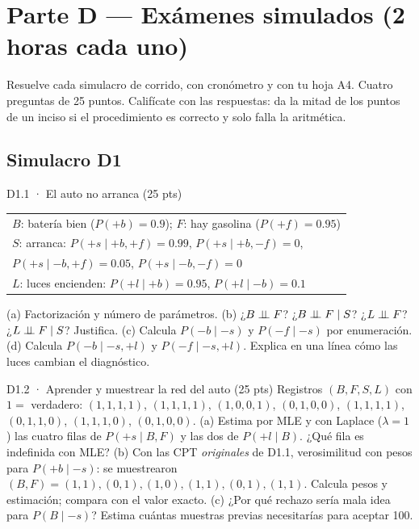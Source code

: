 \newpage
\section{Parte D — Exámenes simulados (2 horas cada uno)}

\begin{nota}
Resuelve cada simulacro de corrido, con cronómetro y con tu hoja A4. Cuatro preguntas de 25 puntos. Califícate con las
respuestas: da la mitad de los puntos de un inciso si el procedimiento es correcto y solo falla la aritmética.
\end{nota}

\subsection*{Simulacro D1}

\begin{ejercicio}{D1.1 · El auto no arranca (25 pts) }
\begin{center}\figCar\qquad
{\small\begin{tabular}{l}
$B$: batería bien ($P(+b)=0.9$); $F$: hay gasolina ($P(+f)=0.95$)\\
$S$: arranca: $P(+s\mid+b,+f)=0.99$, $P(+s\mid+b,-f)=0$,\\
\hspace{3.5em}$P(+s\mid-b,+f)=0.05$, $P(+s\mid-b,-f)=0$\\
$L$: luces encienden: $P(+l\mid+b)=0.95$, $P(+l\mid-b)=0.1$
\end{tabular}}\end{center}
(a)  Factorización y número de parámetros. (b)  ¿$B\perp\!\!\!\perp F$? ¿$B\perp\!\!\!\perp F\mid S$? ¿$L\perp\!\!\!\perp F$? ¿$L\perp\!\!\!\perp F\mid S$? Justifica.
(c)  Calcula $P(-b\mid-s)$ y $P(-f\mid-s)$ por enumeración.
(d)  Calcula $P(-b\mid-s,+l)$ y $P(-f\mid-s,+l)$. Explica en una línea cómo las luces cambian el diagnóstico.
\end{ejercicio}

\begin{ejercicio}{D1.2 · Aprender y muestrear la red del auto (25 pts) }
Registros $(B,F,S,L)$ con $1=$ verdadero: $(1,1,1,1)$, $(1,1,1,1)$, $(1,0,0,1)$, $(0,1,0,0)$, $(1,1,1,1)$, $(0,1,1,0)$, $(1,1,1,0)$, $(0,1,0,0)$.
(a)  Estima por MLE y con Laplace ($\lambda=1$) las cuatro filas de $P(+s\mid B,F)$ y las dos de $P(+l\mid B)$. ¿Qué fila es indefinida con MLE?
(b)  Con las CPT \emph{originales} de D1.1, verosimilitud con pesos para $P(+b\mid-s)$: se muestrearon $(B,F)=(1,1),(0,1),(1,0),(1,1),(0,1),(1,1)$.
Calcula pesos y estimación; compara con el valor exacto.
(c)  ¿Por qué rechazo sería mala idea para $P(B\mid-s)$? Estima cuántas muestras previas necesitarías para aceptar 100.
\end{ejercicio}

